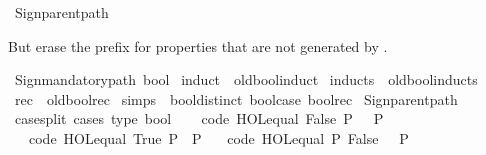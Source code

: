 \begin{isabellebody}
%
\isadelimproof
%
\endisadelimproof
\isanewline
%
\isadelimML
\isanewline
%
\endisadelimML
%
\isatagML
{}\isamarkupfalse%
\ {\isacartoucheopen}Sign{\isachardot}{\kern0pt}parent{\isacharunderscore}{\kern0pt}path{\isacartoucheclose}%
\endisatagML
{\isafoldML}%
%
\isadelimML
%
\endisadelimML
%
\begin{isamarkuptext}%
But erase the prefix for properties that are not generated by .%
\end{isamarkuptext}\isamarkuptrue%
%
\isadelimML
%
\endisadelimML
%
\isatagML
{}\isamarkupfalse%
\ {\isacartoucheopen}Sign{\isachardot}{\kern0pt}mandatory{\isacharunderscore}{\kern0pt}path\ {\isachardoublequote}{\kern0pt}bool{\isachardoublequote}{\kern0pt}{\isacartoucheclose}%
\endisatagML
{\isafoldML}%
%
\isadelimML
%
\endisadelimML
\isanewline
\isanewline
{}\isamarkupfalse%
\ induct\ {\isacharequal}{\kern0pt}\ old{\isachardot}{\kern0pt}bool{\isachardot}{\kern0pt}induct\isanewline
{}\isamarkupfalse%
\ inducts\ {\isacharequal}{\kern0pt}\ old{\isachardot}{\kern0pt}bool{\isachardot}{\kern0pt}inducts\isanewline
{}\isamarkupfalse%
\ rec\ {\isacharequal}{\kern0pt}\ old{\isachardot}{\kern0pt}bool{\isachardot}{\kern0pt}rec\isanewline
{}\isamarkupfalse%
\ simps\ {\isacharequal}{\kern0pt}\ bool{\isachardot}{\kern0pt}distinct\ bool{\isachardot}{\kern0pt}case\ bool{\isachardot}{\kern0pt}rec\isanewline
%
\isadelimML
\isanewline
%
\endisadelimML
%
\isatagML
{}\isamarkupfalse%
\ {\isacartoucheopen}Sign{\isachardot}{\kern0pt}parent{\isacharunderscore}{\kern0pt}path{\isacartoucheclose}%
\endisatagML
{\isafoldML}%
%
\isadelimML
\isanewline
%
\endisadelimML
\isanewline
{}\isamarkupfalse%
\ case{\isacharunderscore}{\kern0pt}split\ {\isacharbrackleft}{\kern0pt}cases\ type{\isacharcolon}{\kern0pt}\ bool{\isacharbrackright}{\kern0pt}\isanewline
\ \ %
\isanewline
\isanewline
{}\isamarkupfalse%
\ {\isacharbrackleft}{\kern0pt}code{\isacharbrackright}{\kern0pt}{\isacharcolon}{\kern0pt}\ {\isachardoublequoteopen}HOL{\isachardot}{\kern0pt}equal\ False\ P\ {\isasymlongleftrightarrow}\ {\isasymnot}\ P{\isachardoublequoteclose}\isanewline
\ \ \ {\isacharbrackleft}{\kern0pt}code{\isacharbrackright}{\kern0pt}{\isacharcolon}{\kern0pt}\ {\isachardoublequoteopen}HOL{\isachardot}{\kern0pt}equal\ True\ P\ {\isasymlongleftrightarrow}\ P{\isachardoublequoteclose}\isanewline
\ \ \ {\isacharbrackleft}{\kern0pt}code{\isacharbrackright}{\kern0pt}{\isacharcolon}{\kern0pt}\ {\isachardoublequoteopen}HOL{\isachardot}{\kern0pt}equal\ P\ False\ {\isasymlongleftrightarrow}\ {\isasymnot}\ P{\isachardoublequoteclose}\isanewline

\end{isabellebody}
